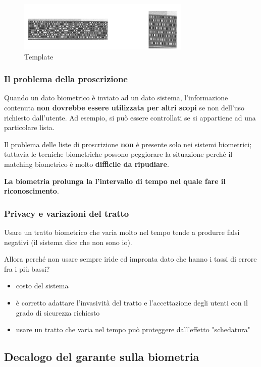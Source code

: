 \begin{figure}
    \centering
    \includegraphics[width=0.5\linewidth]{chapters/images-chap1/template.png}
    \caption{Template}
    \label{fig:template}
\end{figure}

\subsubsection{Il problema della proscrizione}

Quando un dato biometrico è inviato ad un dato sistema, l'informazione contenuta \textbf{non dovrebbe essere utilizzata per altri scopi} se non dell'uso richiesto dall'utente.
Ad esempio, si può essere controllati se si appartiene ad una particolare lista.

Il problema delle liste di proscrizione \textbf{non} è presente solo nei sistemi biometrici; tuttavia le tecniche biometriche possono peggiorare la situazione perché il matching biometrico è molto \textbf{difficile da ripudiare}.

\textbf{La biometria prolunga la l'intervallo di tempo nel quale fare il riconoscimento}.

\subsubsection{Privacy e variazioni del tratto}

Usare un tratto biometrico che varia molto nel tempo tende a produrre falsi negativi (il sistema dice che non sono io).

Allora perché non usare sempre iride ed impronta dato che hanno i tassi di errore fra i più bassi?
\begin{itemize}
    \item costo del sistema
    \item è corretto adattare l'invasività del tratto e l'accettazione degli utenti con il grado di sicurezza richiesto
    \item usare un tratto che varia nel tempo può proteggere dall'effetto "schedatura"
\end{itemize}

\subsection{Decalogo del garante sulla biometria}

